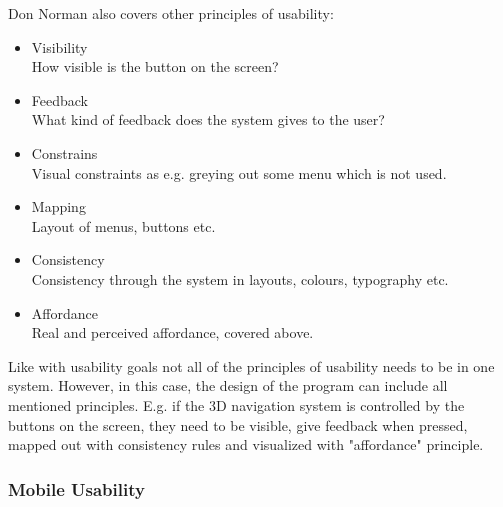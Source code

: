 Don Norman also covers other principles of usability:\cite {Normans}
\begin{itemize}
\item Visibility\\
How visible is the button on the screen?
\item Feedback\\
What kind of feedback does the system gives to the user?
\item Constrains\\
Visual constraints as e.g. greying out some menu which is not used.
\item Mapping \\
Layout of menus, buttons etc.
\item Consistency\\
Consistency through the system in layouts, colours, typography etc.
\item Affordance\\
Real and perceived affordance, covered above.
\end{itemize}

Like with usability goals not all of the principles of usability needs to be in 
one system. However, in this case, the design of the program can include all 
mentioned principles. E.g. if the 3D navigation system is controlled by the 
buttons on the screen, they need to be visible, give   feedback when 
pressed, mapped out with consistency rules and visualized with "affordance" 
principle. 

\subsubsection{Mobile Usability}

